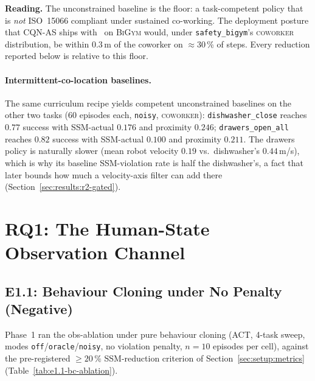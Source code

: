 \documentclass[11pt,a4paper]{report}
\newcommand{\ssm}{SSM}
\newcommand{\iso}{ISO~15066}
\newcommand{\bigym}{\textsc{BiGym}}
\newcommand{\sbigym}{\texttt{safety\_bigym}}
\newcommand{\cqnas}{CQN-AS}
\newcommand{\coworker}{\textsc{coworker}}
\begin{document}
\textbf{Reading.} The unconstrained baseline is the floor: a
task-competent policy that is \emph{not} \iso{} compliant under
sustained co-working. The deployment posture that \cqnas{}
ships with~\cite{seo2024cqnas} on \bigym{} would, under \sbigym{}'s
\coworker{} distribution, be within $0.3$\,m of the coworker on
$\approx$30\,\% of steps. Every reduction reported below is relative to
this floor.

\paragraph{Intermittent-co-location baselines.}
The same curriculum recipe yields competent unconstrained baselines
on the other two tasks (60 episodes each, \texttt{noisy},
\coworker{}): \texttt{dishwasher\_close} reaches $0.77$ success with
\ssm{}-actual $0.176$ and proximity $0.246$;
\texttt{drawers\_open\_all} reaches $0.82$ success with \ssm{}-actual
$0.100$ and proximity $0.211$. The drawers policy is naturally slower
(mean robot velocity $0.19$ vs.\ dishwasher's $0.44$\,m/s), which is
why its baseline \ssm{}-violation rate is half the dishwasher's, a
fact that later bounds how much a velocity-axis filter can add there
(Section~\ref{sec:results:r2-gated}).

\section{RQ1: The Human-State Observation Channel}
\label{sec:results:obs}

\subsection{E1.1: Behaviour Cloning under No Penalty (Negative)}
\label{sec:results:obs-bc}

Phase~1 ran the obs-ablation under pure behaviour cloning (ACT,
4-task sweep, modes \texttt{off}/\texttt{oracle}/\texttt{noisy}, no
violation penalty, $n=10$ episodes per cell), against the
pre-registered $\geq 20\,\%$ \ssm{}-reduction criterion of
Section~\ref{sec:setup:metrics} (Table~\ref{tab:e1.1-bc-ablation}).
\end{document}
